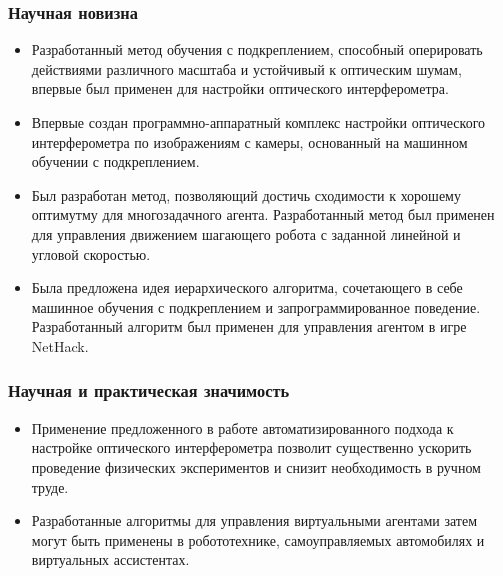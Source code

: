 \begin{frame}
    \frametitle{Научная новизна}
    \begin{itemize}
        \item Разработанный метод обучения с подкреплением, способный оперировать действиями различного масштаба и устойчивый к оптическим шумам, впервые был применен для настройки оптического интерферометра.
        \item Впервые создан программно-аппаратный комплекс настройки оптического интерферометра по изображениям с камеры, основанный на машинном обучении с подкреплением.
        \item Был разработан метод, позволяющий достичь сходимости к хорошему оптимутму для многозадачного агента. Разработанный метод был применен для управления движением шагающего робота с заданной линейной и угловой скоростью.
        \item Была предложена идея иерархического алгоритма, сочетающего в себе машинное обучения с подкреплением и запрограммированное поведение. 
        Разработанный алгоритм был применен для управления агентом в игре NetHack. 
    \end{itemize}
\end{frame}

\begin{frame}
    \frametitle{Научная и практическая значимость}
    \begin{itemize}
        \item Применение предложенного в работе автоматизированного подхода к настройке оптического интерферометра позволит существенно ускорить проведение физических экспериментов и снизит необходимость в ручном труде.
        \item Разработанные алгоритмы для управления виртуальными агентами затем могут быть применены в робототехнике, самоуправляемых автомобилях и виртуальных ассистентах.
    \end{itemize}
\end{frame}



